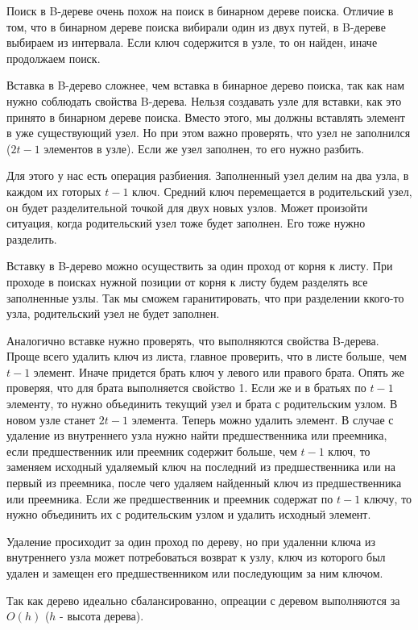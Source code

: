 Поиск в B-дереве очень похож на поиск в бинарном дереве поиска. Отличие в том, что в бинарном дереве поиска вибирали один из двух путей, 
в B-дереве выбираем из интервала. Если ключ содержится в узле, то он найден, иначе продолжаем поиск.


Вставка в B-дерево сложнее, чем вставка в бинарное дерево поиска, так как нам нужно соблюдать свойства B-дерева. 
Нельзя создавать узле для вставки, как это принято в бинарном дереве поиска. Вместо этого, мы должны вставлять элемент в уже существующий узел.
Но при этом важно проверять, что узел не заполнился ($2t-1$ элементов в узле). Если же узел заполнен, то его нужно разбить.

Для этого у нас есть операция разбиения. Заполненный узел делим на два узла, в каждом их готорых $t-1$ ключ. 
Средний ключ перемещается в родительский узел, он будет разделительной точкой для двух новых узлов. Может произойти ситуация, 
когда родительский узел тоже будет заполнен. Его тоже нужно разделить.

Вставку в B-дерево можно осуществить за один проход от корня к листу. 
При проходе в поисках нужной позиции от корня к листу будем разделять все заполненные узлы. Так мы сможем гаранитировать, 
что при разделении ккого-то узла, родительский узел не будет заполнен.


Аналогично вставке нужно проверять, что выполняются свойства B-дерева. Проще всего удалить ключ из листа, 
главное проверить, что в листе больше, чем $t-1$ элемент. Иначе придется брать ключ у левого или правого брата. Опять же проверяя, 
что для брата выполняется свойство 1. Если же и в братьях по $t-1$ элементу, то нужно объединить текущий узел и брата с родительским узлом.
В новом узле станет $2t-1$ элемента. Теперь можно удалить элемент.
В случае с удаление из внутреннего узла нужно найти предшественника или преемника, 
если предшественник или преемник содержит больше, чем $t-1$ ключ, то заменяем исходный удаляемый ключ на последний из предшественника или на первый из преемника,
после чего удаляем найденный ключ из предшественника или преемника.
Если же предшественник и преемник содержат по $t-1$ ключу, то нужно объединить их с родительским узлом и удалить исходный элемент.

Удаление просиходит за один проход по дереву, но при удаленни ключа из внутреннего узла может потребоваться возврат к узлу, 
ключ из которого был удален и замещен его предшественником или последующим за ним ключом.


Так как дерево идеально сбалансированно, опреации с деревом выполняются за $O(h)$ ($h$ - высота дерева).


